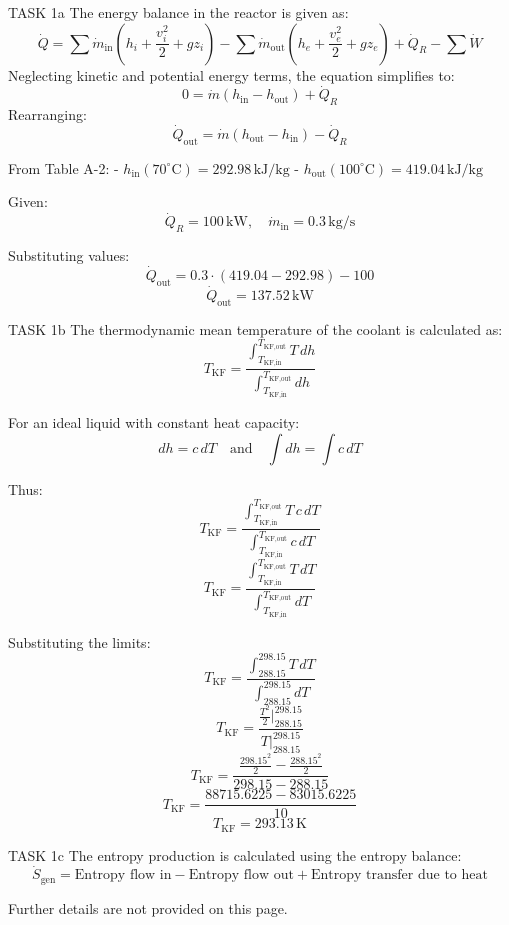 TASK 1a  
The energy balance in the reactor is given as:  
\[
\dot{Q} = \sum \dot{m}_{\text{in}} \left( h_i + \frac{v_i^2}{2} + g z_i \right) - \sum \dot{m}_{\text{out}} \left( h_e + \frac{v_e^2}{2} + g z_e \right) + \dot{Q}_R - \sum \dot{W}
\]  
Neglecting kinetic and potential energy terms, the equation simplifies to:  
\[
0 = \dot{m} \left( h_{\text{in}} - h_{\text{out}} \right) + \dot{Q}_R
\]  
Rearranging:  
\[
\dot{Q}_{\text{out}} = \dot{m} \left( h_{\text{out}} - h_{\text{in}} \right) - \dot{Q}_R
\]  

From Table A-2:  
- \( h_{\text{in}}(70^\circ\text{C}) = 292.98 \, \text{kJ/kg} \)  
- \( h_{\text{out}}(100^\circ\text{C}) = 419.04 \, \text{kJ/kg} \)  

Given:  
\[
\dot{Q}_R = 100 \, \text{kW}, \quad \dot{m}_{\text{in}} = 0.3 \, \text{kg/s}
\]  

Substituting values:  
\[
\dot{Q}_{\text{out}} = 0.3 \cdot (419.04 - 292.98) - 100
\]  
\[
\dot{Q}_{\text{out}} = 137.52 \, \text{kW}
\]  

TASK 1b  
The thermodynamic mean temperature of the coolant is calculated as:  
\[
T_{\text{KF}} = \frac{\int_{T_{\text{KF,in}}}^{T_{\text{KF,out}}} T \, dh}{\int_{T_{\text{KF,in}}}^{T_{\text{KF,out}}} dh}
\]  

For an ideal liquid with constant heat capacity:  
\[
dh = c \, dT \quad \text{and} \quad \int dh = \int c \, dT
\]  

Thus:  
\[
T_{\text{KF}} = \frac{\int_{T_{\text{KF,in}}}^{T_{\text{KF,out}}} T \, c \, dT}{\int_{T_{\text{KF,in}}}^{T_{\text{KF,out}}} c \, dT}
\]  
\[
T_{\text{KF}} = \frac{\int_{T_{\text{KF,in}}}^{T_{\text{KF,out}}} T \, dT}{\int_{T_{\text{KF,in}}}^{T_{\text{KF,out}}} dT}
\]  

Substituting the limits:  
\[
T_{\text{KF}} = \frac{\int_{288.15}^{298.15} T \, dT}{\int_{288.15}^{298.15} dT}
\]  
\[
T_{\text{KF}} = \frac{\frac{T^2}{2} \Big|_{288.15}^{298.15}}{T \Big|_{288.15}^{298.15}}
\]  
\[
T_{\text{KF}} = \frac{\frac{298.15^2}{2} - \frac{288.15^2}{2}}{298.15 - 288.15}
\]  
\[
T_{\text{KF}} = \frac{88715.6225 - 83015.6225}{10}
\]  
\[
T_{\text{KF}} = 293.13 \, \text{K}
\]  

TASK 1c  
The entropy production is calculated using the entropy balance:  
\[
\dot{S}_{\text{gen}} = \text{Entropy flow in} - \text{Entropy flow out} + \text{Entropy transfer due to heat}
\]  

Further details are not provided on this page.